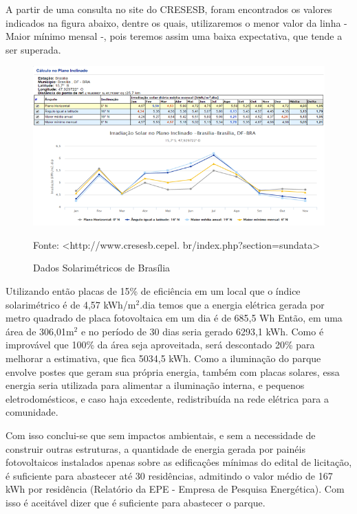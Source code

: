 A partir de uma consulta no site do CRESESB, foram encontrados os valores indicados na figura abaixo, dentre os quais, utilizaremos o menor valor da linha - Maior m\'inimo mensal -, pois teremos assim uma baixa expectativa, que tende a ser superada.

\begin{figure}[h]
	\centering
	\label{Calculo Plano Inclinado}
		\includegraphics[keepaspectratio=true,scale=0.7]{figuras/CalculoPlanoInclinado.png}
	\caption{Dados Solarim\'etricos de Bras\'ilia}
	\small{Fonte:  <http://www.cresesb.cepel. br/index.php?section=sundata>}
\end{figure}

Utilizando ent\~ao placas de 15\% de efici\^encia em um local que o \'indice solarim\'etrico \'e de 4,57 kWh/m$^{2}$.dia temos que a energia el\'etrica gerada por metro quadrado de placa fotovoltaica em um dia \'e de 685,5 Wh Ent\~ao, em uma \'area de 306,01m$^{2}$ e no per\'iodo de 30 dias seria gerado 6293,1 kWh. Como \'e improv\'avel que 100\% da \'area seja aproveitada, ser\'a descontado 20\% para melhorar a estimativa, que fica 5034,5 kWh. Como a ilumina\c{c}\~ao do parque envolve postes que geram sua pr\'opria energia, tamb\'em com placas solares, essa energia seria utilizada para alimentar a ilumina\c{c}\~ao interna, e pequenos eletrodom\'esticos, e caso haja excedente, redistribu\'ida na rede el\'etrica para a comunidade.

Com isso conclui-se que sem impactos ambientais, e sem a necessidade de construir outras estruturas, a quantidade de energia gerada por pain\'eis fotovoltaicos instalados apenas sobre as edifica\c{c}\^oes m\'inimas do edital de licita\c{c}\~ao, \'e suficiente para abastecer at\'e 30 resid\^encias, admitindo o valor m\'edio de 167 kWh por resid\^encia (Relat\'orio da EPE - Empresa de Pesquisa Energ\'etica). Com isso \'e aceit\'avel dizer que \'e suficiente para abastecer o parque.

